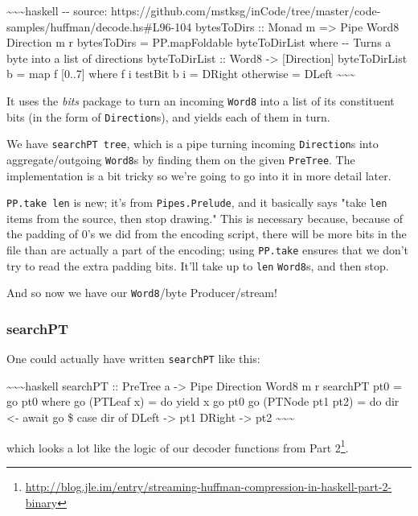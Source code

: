 \documentclass[]{article}
\renewcommand{\href}[2]{#2\footnote{\url{#1}}}
\begin{document}
\textasciitilde{}\textasciitilde{}\textasciitilde{}haskell -\/- source:
https://github.com/mstksg/inCode/tree/master/code-samples/huffman/decode.hs\#L96-104
bytesToDirs :: Monad m =\textgreater{} Pipe Word8 Direction m r bytesToDirs =
PP.mapFoldable byteToDirList where -\/- Turns a byte into a list of directions
byteToDirList :: Word8 -\textgreater{} {[}Direction{]} byteToDirList b = map f
{[}0..7{]} where f i \textbar{} testBit b i = DRight \textbar{} otherwise =
DLeft \textasciitilde{}\textasciitilde{}\textasciitilde{}

It uses the \emph{bits} package to turn an incoming \texttt{Word8} into a list
of its constituent bits (in the form of \texttt{Direction}s), and yields each of
them in turn.

We have \texttt{searchPT\ tree}, which is a pipe turning incoming
\texttt{Direction}s into aggregate/outgoing \texttt{Word8}s by finding them on
the given \texttt{PreTree}. The implementation is a bit tricky so we're going to
go into it in more detail later.

\texttt{PP.take\ len} is new; it's from \texttt{Pipes.Prelude}, and it basically
says "take \texttt{len} items from the source, then stop drawing." This is
necessary because, because of the padding of 0's we did from the encoding
script, there will be more bits in the file than are actually a part of the
encoding; using \texttt{PP.take} ensures that we don't try to read the extra
padding bits. It'll take up to \texttt{len} \texttt{Word8}s, and then stop.

And so now we have our \texttt{Word8}/byte Producer/stream!

\subsubsection{searchPT}

One could actually have written \texttt{searchPT} like this:

\textasciitilde{}\textasciitilde{}\textasciitilde{}haskell searchPT :: PreTree a
-\textgreater{} Pipe Direction Word8 m r searchPT pt0 = go pt0 where go (PTLeaf
x) = do yield x go pt0 go (PTNode pt1 pt2) = do dir \textless{}- await go \$
case dir of DLeft -\textgreater{} pt1 DRight -\textgreater{} pt2
\textasciitilde{}\textasciitilde{}\textasciitilde{}

which looks a lot like the logic of our decoder functions from
\href{http://blog.jle.im/entry/streaming-huffman-compression-in-haskell-part-2-binary}{Part
2}.
\end{document}
